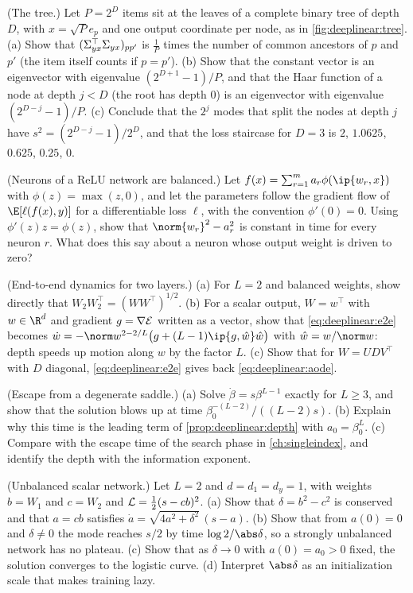 \begin{refsection}
\begin{exercises}
\item \consolidation (The tree.) Let $P=2^D$ items sit at the leaves of a complete binary tree of depth $D$, with $x=\sqrt Pe_p$ and one output coordinate per node, as in \cref{fig:deeplinear:tree}. (a) Show that $(\Sigma_{yx}^\top\Sigma_{yx})_{pp'}$ is $\frac1P$ times the number of common ancestors of $p$ and $p'$ (the item itself counts if $p=p'$). (b) Show that the constant vector is an eigenvector with eigenvalue $(2^{D+1}-1)/P$, and that the Haar function of a node at depth $j<D$ (the root has depth $0$) is an eigenvector with eigenvalue $(2^{D-j}-1)/P$. (c) Conclude that the $2^j$ modes that split the nodes at depth $j$ have $s^2=(2^{D-j}-1)/2^D$, and that the loss staircase for $D=3$ is $2$, $1.0625$, $0.625$, $0.25$, $0$.\label{ex:deeplinear:tree}

\item \consolidation (Neurons of a ReLU network are balanced.) Let $f(x)=\sum_{r=1}^ma_r\phi(\ip{w_r,x})$ with $\phi(z)=\max(z,0)$, and let the parameters follow the gradient flow of $\E[\ell(f(x),y)]$ for a differentiable loss $\ell$, with the convention $\phi'(0)=0$. Using $\phi'(z)z=\phi(z)$, show that $\norm{w_r}^2-a_r^2$ is constant in time for every neuron $r$. What does this say about a neuron whose output weight is driven to zero?\label{ex:deeplinear:relu}

\item \consolidation (End-to-end dynamics for two layers.) (a) For $L=2$ and balanced weights, show directly that $W_2W_2^\top=(WW^\top)^{1/2}$. (b) For a scalar output, $W=w^\top$ with $w\in\R^d$ and gradient $g=\nabla\mathcal{E}$ written as a vector, show that \eqref{eq:deeplinear:e2e} becomes $\dot w=-\norm w^{2-2/L}\bigl(g+(L-1)\ip{g,\hat w}\hat w\bigr)$ with $\hat w=w/\norm w$: depth speeds up motion along $w$ by the factor $L$. (c) Show that for $W=UDV^\top$ with $D$ diagonal, \eqref{eq:deeplinear:e2e} gives back \eqref{eq:deeplinear:aode}.\label{ex:deeplinear:e2e}

\item \consolidation (Escape from a degenerate saddle.) (a) Solve $\dot\beta=s\beta^{L-1}$ exactly for $L\ge3$, and show that the solution blows up at time $\beta_0^{-(L-2)}/((L-2)s)$. (b) Explain why this time is the leading term of \cref{prop:deeplinear:depth} with $a_0=\beta_0^L$. (c) Compare with the escape time of the search phase in \cref{ch:singleindex}, and identify the depth with the information exponent.\label{ex:deeplinear:escape}

\item \variation (Unbalanced scalar network.) Let $L=2$ and $d=d_1=d_y=1$, with weights $b=W_1$ and $c=W_2$ and $\mathcal{L}=\frac12(s-cb)^2$. (a) Show that $\delta=b^2-c^2$ is conserved and that $a=cb$ satisfies $\dot a=\sqrt{4a^2+\delta^2}\,(s-a)$. (b) Show that from $a(0)=0$ and $\delta\ne0$ the mode reaches $s/2$ by time $\log2/\abs\delta$, so a strongly unbalanced network has no plateau. (c) Show that as $\delta\to0$ with $a(0)=a_0>0$ fixed, the solution converges to the logistic curve. (d) Interpret $\abs\delta$ as an initialization scale that makes training lazy.\label{ex:deeplinear:unbalanced}


\end{exercises}
\end{refsection}
